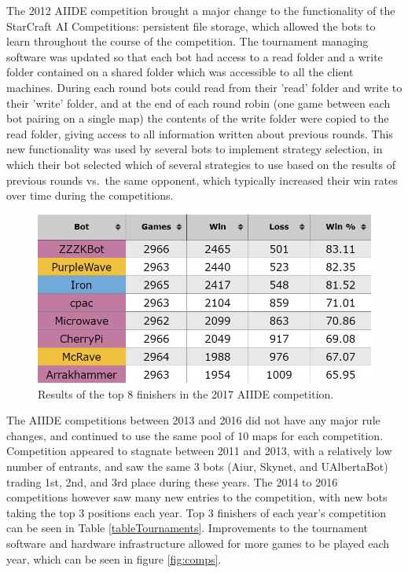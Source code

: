The 2012 AIIDE competition brought a major change to the functionality of the StarCraft AI Competitions: persistent file storage, which allowed the bots to learn throughout the course of the competition. The tournament managing software was updated so that each bot had access to a read folder and a write folder contained on a shared folder which was accessible to all the client machines. During each round bots could read from their 'read' folder and write to their 'write' folder, and at the end of each round robin (one game between each bot pairing on a single map) the contents of the write folder were copied to the read folder, giving access to all information written about previous rounds. This new functionality was used by several bots to implement strategy selection, in which their bot selected which of several strategies to use based on the results of previous rounds vs.\ the same opponent, which typically increased their win rates over time during the competitions.

\begin{figure}[t]
  \centering
  \includegraphics[width=1\columnwidth]{fig/aiide2017.png}
  \caption{Results of the top 8 finishers in the 2017 AIIDE competition.}
  \label{figAIIDEresults}
\end{figure}

The AIIDE competitions between 2013 and 2016 did not have any major rule changes, and continued to use the same pool of 10 maps for each competition. Competition appeared to stagnate between 2011 and 2013, with a relatively low number of entrants, and saw the same 3 bots (Aiur, Skynet, and UAlbertaBot) trading 1st, 2nd, and 3rd place during these years. The 2014 to 2016 competitions however saw many new entries to the competition, with new bots taking the top 3 positions each year. Top 3 finishers of each year's competition can be seen in Table \ref{tableTournaments}. Improvements to the tournament software and hardware infrastructure allowed for more games to be played each year, which can be seen in figure \ref{fig:comps}.

